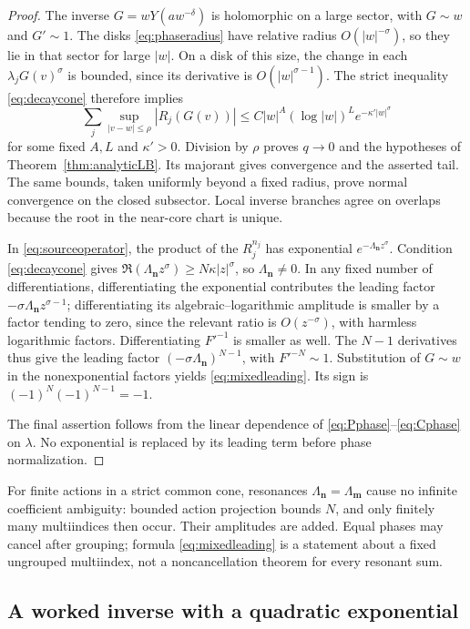 \documentclass[11pt,a4paper]{article}
\theoremstyle{definition}
\theoremstyle{remark}
\newcommand{\nn}{\boldsymbol n}
\numberwithin{equation}{section}
\begin{document}
\begin{proof}
The inverse $G=wY(aw^{-\delta})$ is holomorphic on a large sector, with $G\sim w$ and $G'\sim1$. The disks \eqref{eq:phaseradius} have relative radius $O(|w|^{-\sigma})$, so they lie in that sector for large $|w|$. On a disk of this size, the change in each $\lambda_jG(v)^\sigma$ is bounded, since its derivative is $O(|w|^{\sigma-1})$. The strict inequality \eqref{eq:decaycone} therefore implies
\[
 \sum_j\sup_{|v-w|\le\rho}|R_j(G(v))|
 \le C|w|^A(\log|w|)^L e^{-\kappa'|w|^\sigma}
\]
for some fixed $A,L$ and $\kappa'>0$. Division by $\rho$ proves $q\to0$ and the hypotheses of Theorem~\ref{thm:analyticLB}. Its majorant gives convergence and the asserted tail. The same bounds, taken uniformly beyond a fixed radius, prove normal convergence on the closed subsector. Local inverse branches agree on overlaps because the root in the near-core chart is unique.

In \eqref{eq:sourceoperator}, the product of the $R_j^{n_j}$ has exponential $e^{-\Lambda_{\nn}z^\sigma}$. Condition \eqref{eq:decaycone} gives
$\Re(\Lambda_{\nn}z^\sigma)\ge N\kappa|z|^\sigma$, so $\Lambda_{\nn}\ne0$. In any fixed number of differentiations, differentiating the exponential contributes the leading factor $-\sigma\Lambda_{\nn}z^{\sigma-1}$; differentiating its algebraic--logarithmic amplitude is smaller by a factor tending to zero, since the relevant ratio is $O(z^{-\sigma})$, with harmless logarithmic factors. Differentiating $F'^{-1}$ is smaller as well. The $N-1$ derivatives thus give the leading factor $(-\sigma\Lambda_{\nn})^{N-1}$, with $F'^{-N}\sim1$. Substitution of $G\sim w$ in the nonexponential factors yields \eqref{eq:mixedleading}. Its sign is $(-1)^N(-1)^{N-1}=-1$.

The final assertion follows from the linear dependence of \eqref{eq:Pphase}--\eqref{eq:Cphase} on $\lambda$. No exponential is replaced by its leading term before phase normalization.
\end{proof}

For finite actions in a strict common cone, resonances $\Lambda_{\nn}=\Lambda_{\boldsymbol m}$ cause no infinite coefficient ambiguity: bounded action projection bounds $N$, and only finitely many multiindices then occur. Their amplitudes are added. Equal phases may cancel after grouping; formula \eqref{eq:mixedleading} is a statement about a fixed ungrouped multiindex, not a noncancellation theorem for every resonant sum.

\subsection{A worked inverse with a quadratic exponential}
\end{document}
